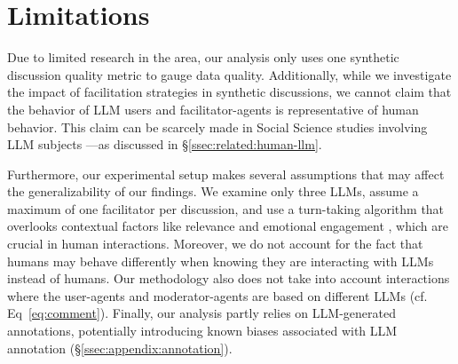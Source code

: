 %
\section{Limitations} 
\label{sec:limitations}

Due to limited research in the area, our analysis only uses one synthetic discussion quality metric to gauge data quality. Additionally, while we investigate the impact of facilitation strategies in synthetic discussions, we cannot claim that the behavior of \ac{LLM} users and facilitator-agents is representative of human behavior. This claim can be scarcely made in Social Science studies involving \ac{LLM} subjects \cite{rossi_2024, zhou-etal-2024-real}—as discussed in \S\ref{ssec:related:human-llm}.

Furthermore, our experimental setup makes several assumptions that may affect the generalizability of our findings. We examine only three \acp{LLM}, assume a maximum of one facilitator per discussion, and use a turn-taking algorithm that overlooks contextual factors like relevance and emotional engagement \cite{robert_2016_comment, Ziegele03102018}, which are crucial in human interactions. Moreover, we do not account for the fact that humans may behave differently when knowing they are interacting with \acp{LLM} instead of humans. Our methodology also does not take into account interactions where the user-agents and moderator-agents are based on different \acp{LLM} (cf. Eq~\ref{eq:comment}). Finally, our analysis partly relies on \ac{LLM}-generated annotations, potentially introducing known biases associated with \ac{LLM} annotation (\S\ref{ssec:appendix:annotation}).